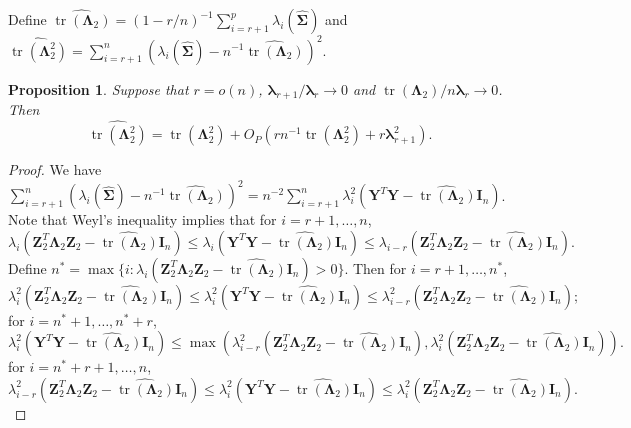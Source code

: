 \documentclass[12pt]{article} %
\DeclareMathOperator{\mytr}{tr}
\newcommand{\bZ}{\mathbf{Z}}
\newcommand{\bY}{\mathbf{Y}}
\newcommand{\bI}{\mathbf{I}}
\newcommand{\bfsym}[1]{\ensuremath{\boldsymbol{#1}}}
\def\blambda {\bfsym {\lambda}}
\def\bLambda {\bfsym {\Lambda}}
\def\bSigma {\bfsym {\Sigma}}
\newtheorem{proposition}{Proposition}
\theoremstyle{definition}
\begin{document}
\begin{appendices}
Define $\widehat{\mytr(\bLambda_2)}=(1-{r}/{n})^{-1}\sum_{i=r+1}^p \lambda_i (\hat{\bSigma})$ and
$\widehat{\mytr(\bLambda_2^2)}=\sum_{i=r+1}^n (\lambda_i(\hat{\bSigma})-n^{-1}\widehat{\mytr(\bLambda_2)})^2$.
\begin{proposition}
    \label{eigenvalueProp:R3}
    Suppose that $r=o(n)$, $\blambda_{r+1}/\blambda_r\to 0$ and $\mytr(\bLambda_2)/n\blambda_{r}\to 0$.
    Then
    \begin{equation*}
\widehat{\mytr(\bLambda_2^2)}
        =
         \mytr(\bLambda_2^2)
        +
        O_P\left(rn^{-1} \mytr(\bLambda_2^2) + r  \blambda_{r+1}^2\right).
    \end{equation*}
\end{proposition}
\begin{proof}
    We have
        $
        \sum_{i=r+1}^n (\lambda_i(\hat{\bSigma})-n^{-1}\widehat{\mytr(\bLambda_2)})^2
        =
        n^{-2}\sum_{i=r+1}^n \lambda_i^2(\bY^T \bY-\widehat{\mytr(\bLambda_2)}\bI_n)
        $.
        Note that Weyl's inequality implies that for $i=r+1,\ldots,n$,
        \begin{equation*}
            \lambda_{i}(\bZ_2^T \bLambda_2 \bZ_2 - \widehat{\mytr(\bLambda_2)}\bI_n)
            \leq
            \lambda_i(\bY^T \bY-\widehat{\mytr(\bLambda_2)}\bI_n)
            \leq
            \lambda_{i-r}(\bZ_2^T \bLambda_2 \bZ_2 - \widehat{\mytr(\bLambda_2)}\bI_n).
        \end{equation*}
Define
$
    n^*=\max\{i:
        \lambda_i\left(\bZ_2^T \bLambda_2 \bZ_2-\widehat{\mytr(\bLambda_2)}\bI_n\right)> 0
    \}
    $.
    Then for $i=r+1,\ldots, n^*$,
    \begin{equation*}
        \lambda_i^2(\bZ_2^T \bLambda_2 \bZ_2-\widehat{\mytr(\bLambda_2)}\bI_n) \leq \lambda_i^2(\bY^T \bY-\widehat{\mytr(\bLambda_2)}\bI_n)\leq \lambda_{i-r}^2(\bZ_2^T \bLambda_2 \bZ_2-\widehat{\mytr(\bLambda_2)}\bI_n);
    \end{equation*}
    for $i=n^*+1,\ldots, n^*+r$,
    \begin{equation*}
        \lambda_i^2(\bY^T \bY-\widehat{\mytr(\bLambda_2)}\bI_n)\leq
        \max
        \left(
            \lambda_{i-r}^2(\bZ_2^T \bLambda_2 \bZ_2-\widehat{\mytr(\bLambda_2)}\bI_n) 
        ,
        \lambda_{i}^2(\bZ_2^T \bLambda_2 \bZ_2-\widehat{\mytr(\bLambda_2)}\bI_n)
    \right).
    \end{equation*}
    for $i=n^*+r+1,\ldots, n$,
    \begin{equation*}
        \lambda_{i-r}^2(\bZ_2^T \bLambda_2 \bZ_2-\widehat{\mytr(\bLambda_2)}\bI_n) \leq \lambda_i^2(\bY^T \bY-\widehat{\mytr(\bLambda_2)}\bI_n)\leq \lambda_{i}^2(\bZ_2^T \bLambda_2 \bZ_2-\widehat{\mytr(\bLambda_2)}\bI_n).

\end{equation*}
\end{proof}
\end{appendices}
\end{document}
